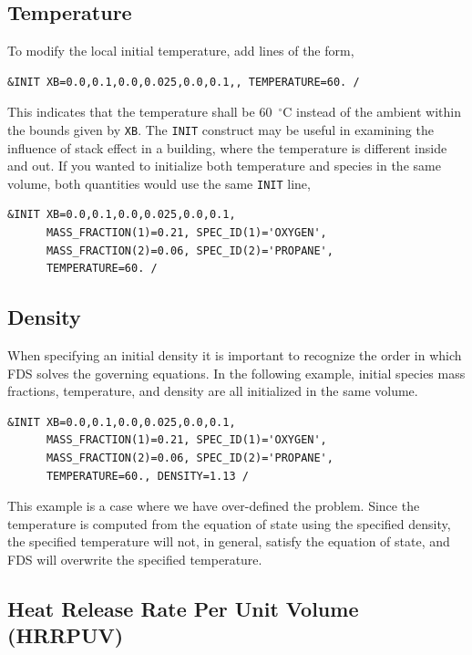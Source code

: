 \documentclass[11pt]{book}
\newcommand{\ct}{\tt\small}
\begin{document}
\subsection*{Temperature}

To modify the local initial temperature, add lines of the form,

\footnotesize
\begin{verbatim}
&INIT XB=0.0,0.1,0.0,0.025,0.0,0.1,, TEMPERATURE=60. /
\end{verbatim}

\normalsize
\noindent This indicates that the temperature shall be 60~$^\circ$C instead of the ambient within the bounds given by {\ct XB}. The {\ct INIT} construct may be useful in examining the influence of stack effect in a building, where the temperature is different inside and out. If you wanted to initialize both temperature and species in the same volume, both quantities would use the same {\ct INIT} line,

\footnotesize
\begin{verbatim}
&INIT XB=0.0,0.1,0.0,0.025,0.0,0.1,
      MASS_FRACTION(1)=0.21, SPEC_ID(1)='OXYGEN',
      MASS_FRACTION(2)=0.06, SPEC_ID(2)='PROPANE',
      TEMPERATURE=60. /
\end{verbatim}
\normalsize

\subsection*{Density}

When specifying an initial density it is important to recognize the order in which FDS solves the governing equations. In the following example, initial species mass fractions, temperature, and density are all initialized in the same volume.

\footnotesize
\begin{verbatim}
&INIT XB=0.0,0.1,0.0,0.025,0.0,0.1,
      MASS_FRACTION(1)=0.21, SPEC_ID(1)='OXYGEN',
      MASS_FRACTION(2)=0.06, SPEC_ID(2)='PROPANE',
      TEMPERATURE=60., DENSITY=1.13 /
\end{verbatim}
\normalsize

\noindent This example is a case where we have over-defined the problem. Since the temperature is computed from the equation of state using the specified density, the specified temperature will not, in general, satisfy the equation of state, and FDS will overwrite the specified temperature.

\subsection*{Heat Release Rate Per Unit Volume (HRRPUV)}
\end{document}
